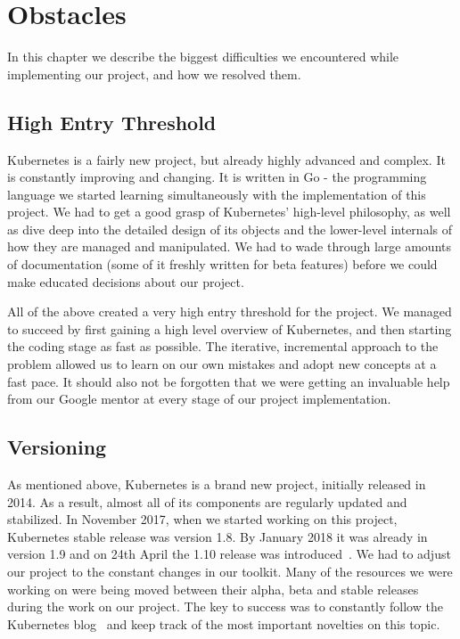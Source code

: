 \chapter{Obstacles}
In this chapter we describe the biggest difficulties we encountered while implementing our project,
and how we resolved them.

\section{High Entry Threshold}
Kubernetes is a fairly new project, but already highly advanced and complex. It is constantly
improving and changing. It is written in Go - the programming language we started learning
simultaneously with the implementation of this project. We had to get a good grasp of Kubernetes’
high-level philosophy, as well as dive deep into the detailed design of its objects and the
lower-level internals of how they are managed and manipulated. We had to wade through large amounts
of documentation (some of it freshly written for beta features) before we could make educated
decisions about our project.

All of the above created a very high entry threshold for the project. We managed to succeed by
first gaining a high level overview of Kubernetes, and then starting the coding stage as fast as
possible. The iterative, incremental approach to the problem allowed us to learn on our own mistakes
and adopt new concepts at a fast pace. It should also not be forgotten that we were getting an
invaluable help from our Google mentor at every stage of our project implementation.

\section{Versioning}
As mentioned above, Kubernetes is a brand new project, initially released in 2014. As a result,
almost all of its components are regularly updated and stabilized. In November 2017, when we
started working on this project, Kubernetes stable release was version 1.8. By January 2018 it was
already in version 1.9 and on 24th April the 1.10 release was introduced~\cite{releases}. We had to adjust our
project to the constant changes in our toolkit. Many of the resources we were working on were
being moved between their alpha, beta and stable releases during the work on our project. The key to
success was to constantly follow the Kubernetes blog~\cite{blog} and keep track of the most important novelties
on this topic.

